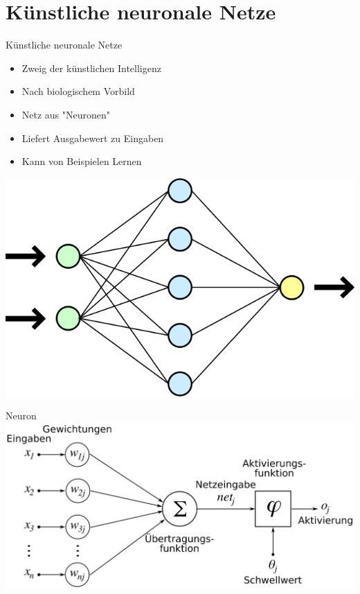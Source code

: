 \section{Künstliche neuronale Netze}

\begin{slide}{Künstliche neuronale Netze}
	\begin{itemize}
		\item Zweig der künstlichen Intelligenz
		\item Nach biologischem Vorbild
		\item Netz aus "Neuronen"
		\item Liefert Ausgabewert zu Eingaben
		\item Kann von Beispielen Lernen
	\end{itemize}
	\begin{center}
		\includegraphics[width=\textwidth,height=0.4\textheight,keepaspectratio]{content/Neural_network}
	\end{center}
\end{slide}

\begin{slide}{Neuron}
	\includegraphics[width=\textwidth,height=0.8\textheight,keepaspectratio]{content/ArtificialNeuronModel}
\end{slide}

